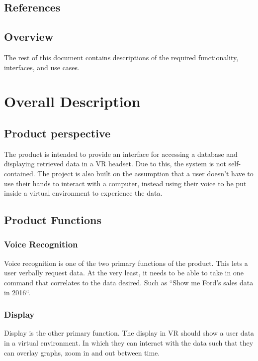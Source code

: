 \documentclass[onecolumn, draftclsnofoot,10pt, compsoc]{IEEEtran}
\begin{document}
    \subsection{References}
        
        

    \subsection{Overview}
        The rest of this document contains descriptions of the required functionality, interfaces, and use cases.
    \section{Overall Description}

    \subsection{Product perspective}
        The product is intended to provide an interface for accessing a database and displaying retrieved data in a VR headset. Due to this, the system is not self-contained. The project is also built on the assumption that a user doesn’t have to use their hands to interact with a computer, instead using their voice to be put inside a virtual environment to experience the data.

    \subsection{Product Functions}

        \subsubsection{Voice Recognition}
            Voice recognition is one of the two primary functions of the product. This lets a user verbally request data. At the very least, it needs to be able to take in one command that correlates to the data desired. Such as ``Show me Ford’s sales data in 2016``.

        \subsubsection{Display}
            Display is the other primary function. The display in VR should show a user data in a virtual environment. In which they can interact with the data such that they can overlay graphs, zoom in and out between time.
\end{document}
